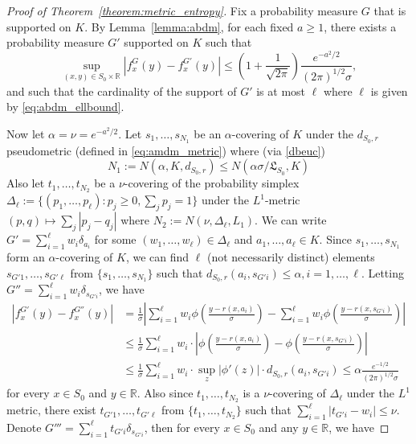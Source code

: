 \documentclass[11pt]{article}
\numberwithin{equation}{section}
\newcommand{\RS}{\mathbb{R}}
\newcommand{\dbeta}{d_{S_0,r}}
\newcommand{\lipsz}{\mathfrak{L}}
\begin{document}
\begin{appendices}
\begin{proof}[Proof of Theorem~\ref{theorem:metric_entropy}]
  Fix a probability measure $G$ that is supported on $K$. By Lemma~\ref{lemma:abdm}, for each fixed $a \geq 1$, there exists a probability measure $G'$ supported on $K$  such that
\[
\sup_{(x,y) \in S_0\times \RS} |f^G_x(y) - f^{G'}_x(y)| \leq \left(1+\frac{1}{\sqrt{2\pi}}\right)\frac{e^{-a^2/2}}{(2\pi)^{1/2}\sigma},
\]
and such that the cardinality of the support of $G'$ is at most $\ell$ where $\ell$ is given by \eqref{eq:abdm_ellbound}.

Now let $\alpha = \nu = e^{-a^2/2}$. Let $s_1, \dots, s_{N_1}$ be an $\alpha$-covering of $K$ under the $\dbeta$ pseudometric (defined in \eqref{eq:amdm_metric}) where (via \eqref{dbeuc})
\begin{equation}\label{tte1}
N_1 := N(\alpha, K, \dbeta) \leq N(\alpha \sigma/\lipsz_{S_0}, K)
\end{equation}
Also let $t_1, \dots, t_{N_2}$ be a $\nu$-covering of the probability simplex $\Delta_{\ell} := \{(p_1, \dots, p_{\ell}) : p_j \geq 0, \sum_{j} p_j = 1\}$ under the $L^1$-metric $(p, q) \mapsto \sum_{j} |p_j - q_j|$ where $N_2 := N(\nu, \Delta_{\ell}, L_1)$.  We can write $G' = \sum_{i=1}^\ell w_i \delta_{a_i}$ for some $(w_1, \dots, w_{\ell}) \in \Delta_{\ell}$ and $a_1, \dots, a_{\ell} \in K$. Since  $s_1,\dots,s_{N_1}$ form an $\alpha$-covering of $K$, we  can find $\ell$ (not necessarily distinct) elements $s_{G'1},\dots, s_{G'\ell}$ from  $\{s_1,\dots,s_{N_1}\}$ such  that $\dbeta(a_i,s_{G'i})\leq \alpha, i = 1, \dots, \ell$. Letting $G''= \sum_{i=1}^\ell w_i \delta_{s_{G'i}}$, we have 
\[
\begin{split}
|f_x^{G'}(y) - f_x^{G''}(y)|& = \frac{1}{\sigma} \left|\sum_{i=1}^\ell w_i \phi \left(\frac{y - r(x,a_i)}{\sigma} \right) - \sum_{i=1}^\ell w_i \phi \left(\frac{y -r(x, s_{G'i})}{\sigma} \right) \right|\\
&\leq \frac{1}{\sigma} \sum_{i=1}^\ell w_i \cdot  \left| \phi \left(\frac{y - r(x,a_i)}{\sigma} \right) -  \phi\left(\frac{y -r(x, s_{G'i})}{\sigma} \right) \right| \\
& \leq \frac{1}{\sigma} \sum_{i=1}^\ell w_i \cdot\sup_{z }|\phi'(z)|\cdot \dbeta (a_i, s_{G'i}) \leq \alpha \frac{e^{-1/2}}{(2\pi)^{1/2} \sigma}
\end{split}
\]
for every $x \in S_0$ and $y \in \RS$. Also since $t_1,\dots, t_{N_2}$ is a $\nu$-covering of $\Delta_{\ell}$ under the $L^1$ metric, there exist $t_{G'1}, \dots, t_{G'\ell}$ from $\{t_1,\dots, t_{N_2} \}$ such that $\sum_{i=1}^\ell|t_{G'i} - w_i| \leq \nu$. Denote $G''' = \sum_{i=1}^\ell t_{G'i} \delta_{s_{G'i}} $, then for every $x\in S_0$ and any $y \in \RS$, we have

\end{proof}
\end{appendices}
\end{document}
